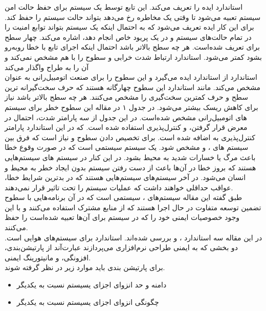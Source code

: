 \documentclass[a4paper, 12pt]{article}
\begin{document}
استاندارد
ایده
را تعریف می‌کند. این تابع توسط یک سیستم برای حفظ حالت امن سیستم تعبیه می‌شود تا
وقتی یک مخاطره رخ می‌دهد بتواند حالت سیستم را حفظ کند.
برای این کار ایده
تعریف می‌شود که به احتمال اینکه یک سیستم بتواند توابع امنیت را در تمام حالت‌های سیستم و در یک
پریود خاص انجام دهد، اشاره می‌کند.
چهار سطح برای
تعریف شده‌است. هر چه سطح بالاتر باشد احتمال اینکه اجرای تابع با خطا روبه‌رو بشود کمتر می‌شود.
استاندارد
ارتباط شدت خرابی و سطوح
را با هم مشخص نمی‌کند و آن را به طراح واگذار می‌کند \\
استاندارد
از استاندارد
ایده می‌گیرد و این سطوح را برای صنعت اتومبیل‌رانی به عنوان
مشخص می‌کند.
مانند استاندارد
این سطوح چهارگانه هستند که حرف
سخت‌گیرانه ترین سطح و حرف
کمترین سخت‌گیری را مشخص می‌کنند.
هر چه سطح
بالاتر باشد نیاز برای کاهش ریسک بیشتر می‌شود.
در جدول ۱ در مقاله این سطوح خطر برای سیستم های اتومبیل‌رانی مشخص شده‌است.
در این جدول از سه پارامتر شدت، احتمال در معرض قرار گرفتن، و کنترل‌پذیری استفاده شده است.
که در این استاندارد پارامتر کنترل‌پذیری به 
اضافه شده است.
برای تخصیص دادن سطوح
و
نیاز است که فرق بین سیستم های
،
و
مشخص شود.
یک سیستم
سیستمی است که در صورت وقوع خطا باعث مرگ یا خسارات شدید به محیط بشود.
در این کنار در سیستم های
سیستم‌هایی هستند که بروز خطا در آن‌ها باعث از دست رفتن سیستم بدون ایجاد خطر به محیط و انسان
می‌شود.
در آخر سیستم‌های
سیستم‌هایی هستند که در بدترین شرایط خطا، عواقب حداقلی خواهند داشت که عملیات سیستم را تحت
تاثیر قرار نمی‌دهند. \\
طبق گفته این مقاله سیستم‌های
، سیستمی است که در آن برنامه‌هایی با سطوح تضمین توسعه متفاوت در حال اجرا هستند
که از منابع مشترک استفاده می‌کنند و با این وجود خصوصیات ایمنی خود را که در سیستم برای آن‌ها
تعبیه شده‌است را حفظ می‌کنند. \\
در این مقاله سه استاندارد
،
و 
بررسی شده‌اند.
استاندارد
برای سیستم‌های هوایی است. دو بخشی که به ایمنی طراحی نرم‌افزاری می‌پردازند عبارت‌آند از
پارتیشن‌بندی، افزونگی، و مانیتورینگ ایمنی. \\
برای پارتیشن بندی باید موارد زیر در نظر گرفته شوند.
\begin{itemize}
    \item دامنه و حد انزوای اجزای یسیستم نسبت به یکدیگر
    \item چگونگی انزوای اجزای یسیستم نسبت به یکدیگر
\end{itemize}
\end{document}
